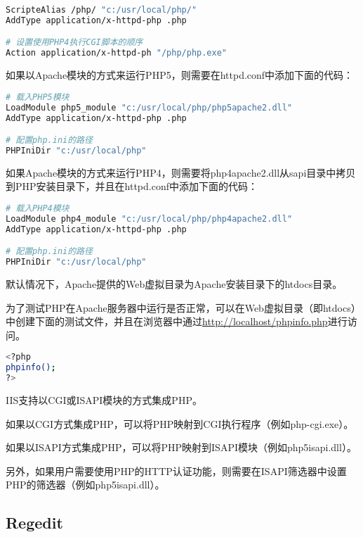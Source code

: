 \begin{lstlisting}[language=bash]
ScripteAlias /php/ "c:/usr/local/php/"
AddType application/x-httpd-php .php

# 设置使用PHP4执行CGI脚本的顺序
Action application/x-httpd-ph "/php/php.exe"
\end{lstlisting}

如果以Apache模块的方式来运行PHP5，则需要在httpd.conf中添加下面的代码：


\begin{lstlisting}[language=bash]
# 载入PHP5模块
LoadModule php5_module "c:/usr/local/php/php5apache2.dll"
AddType application/x-httpd-php .php

# 配置php.ini的路径
PHPIniDir "c:/usr/local/php"
\end{lstlisting}


如果Apache模块的方式来运行PHP4，则需要将php4apache2.dll从sapi目录中拷贝到PHP安装目录下，并且在httpd.conf中添加下面的代码：

\begin{lstlisting}[language=bash]
# 载入PHP4模块
LoadModule php4_module "c:/usr/local/php/php4apache2.dll"
AddType application/x-httpd-php .php

# 配置php.ini的路径
PHPIniDir "c:/usr/local/php"
\end{lstlisting}

默认情况下，Apache提供的Web虚拟目录为Apache安装目录下的htdocs目录。

为了测试PHP在Apache服务器中运行是否正常，可以在Web虚拟目录（即htdocs）中创建下面的测试文件，并且在浏览器中通过\url{http://localhost/phpinfo.php}进行访问。



\begin{lstlisting}[language=bash]
<?php
phpinfo();
?>
\end{lstlisting}

IIS支持以CGI或ISAPI模块的方式集成PHP。


\begin{compactitem}
\item 如果以CGI方式集成PHP，可以将PHP映射到CGI执行程序（例如php-cgi.exe）。
\item 如果以ISAPI方式集成PHP，可以将PHP映射到ISAPI模块（例如php5isapi.dll）。
\end{compactitem}

另外，如果用户需要使用PHP的HTTP认证功能，则需要在ISAPI筛选器中设置PHP的筛选器（例如php5isapi.dll）。

\subsection{Regedit}


